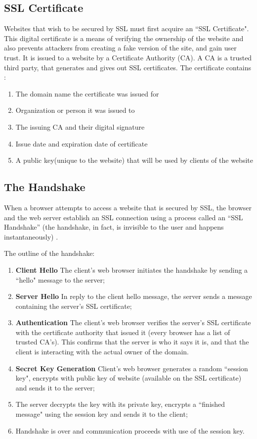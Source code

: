 \subsection{SSL Certificate} 
Websites that wish to be secured by SSL must first acquire an ``SSL Certificate". 
This digital certificate is a means of verifying the ownership of the website and also prevents attackers from creating a fake version of the site, and gain user trust. 
It is issued to a website by a Certificate Authority (CA). 
A CA is a trusted third party, that generates and gives out SSL certificates. The certificate contains \cite{cloudflare_certificate}:
\begin{enumerate}
    \item The domain name the certificate was issued for
    \item Organization or person it was issued to
    \item The issuing CA and their digital signature
    \item Issue date and expiration date of certificate
    \item A public key(unique to the website) that will be used by clients of the website
\end{enumerate}

\subsection{The Handshake} 

When a browser attempts to access a website that is secured by SSL, the browser and the web server establish an SSL connection using a process called an “SSL Handshake” (the handshake, in fact, is invisible to the user and happens instantaneously) \cite{digicert, cloudflare_handshake}.

The outline of the handshake:

\begin{enumerate}
\item \textbf{Client Hello} The client's web browser initiates the handshake by sending a ``hello" message to the server;
\item \textbf{Server Hello} In reply to the client hello message, the server sends a message containing the server's SSL certificate;
\item \textbf{Authentication} The client's web browser verifies the server's SSL certificate with the certificate authority that issued it (every browser has a list of trusted CA's). This confirms that the server is who it says it is, and that the client is interacting with the actual owner of the domain.
\item \textbf{Secret Key Generation} Client's web browser generates a random ``session key",  encrypts with public key of website (available on the SSL certificate) and sends it to the server;
\item The server decrypts the key with its private key, encrypts a ``finished message" using the session key and sends it to the client;
\item Handshake is over and communication proceeds with use of the session key.
\end{enumerate}
